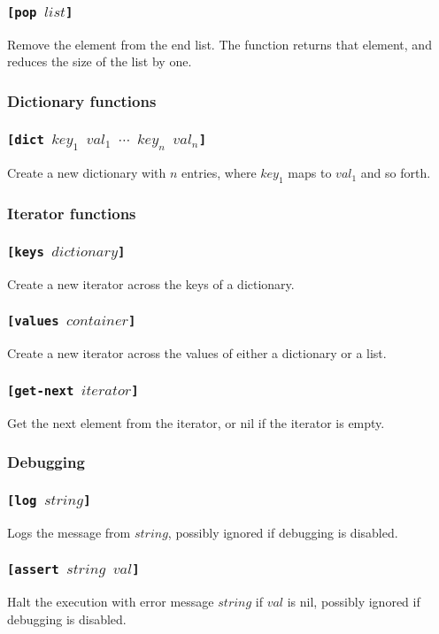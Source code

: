 \documentclass[11pt]{report}
\begin{document}
\subsubsection*{\tt{[pop }$list$\tt{]}}
Remove the element from the end list. The function returns that element, and reduces the size of the list by one.

\subsubsection{Dictionary functions}
\subsubsection*{\tt{[dict }$key_1$  $val_1$ $\cdots$ $key_n$ $val_n$\tt{]}}
Create a new dictionary with $n$ entries, where $key_1$ maps to $val_1$ and so forth.

\subsubsection{Iterator functions}
\subsubsection*{\tt{[keys }$dictionary$\tt{]}}
Create a new iterator across the keys of a dictionary.
\subsubsection*{\tt{[values }$container$\tt{]}}
Create a new iterator across the values of either a dictionary or a list.
\subsubsection*{\tt{[get-next }$iterator$\tt{]}}
Get the next element from the iterator, or nil if the iterator is empty.

\subsubsection{Debugging}
\subsubsection*{\tt{[log }$string$\tt{]}}
Logs the message from $string$, possibly ignored if debugging is disabled.
\subsubsection*{\tt{[assert }$string$ $val$\tt{]}}
Halt the execution with error message $string$ if $val$ is nil, possibly ignored if debugging is disabled.
\end{document}

